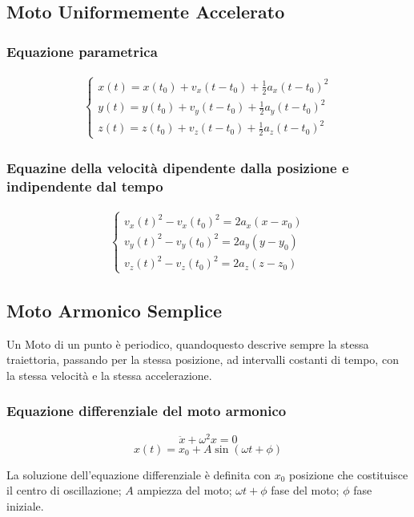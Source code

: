 \documentclass[12pt,a4paper]{report}
\begin{document}
	\subsection{Moto Uniformemente Accelerato}
		\subsubsection{Equazione parametrica}
	
		\begin{align*} 
		\begin{cases} x(t)= x(t_{0})+v_{x}(t-t_{0})+\frac{1}{2}a_{x}(t-t_{0})^{2}\\y(t)= y(t_{0})+v_{y}(t-t_{0})+\frac{1}{2}a_{y}(t-t_{0})^{2}\\z(t)= z(t_{0})+v_{z}(t-t_{0})+\frac{1}{2}a_{z}(t-t_{0})^{2} \end{cases}
		\end{align*}
	
		\subsubsection{Equazine della velocità dipendente dalla posizione e indipendente dal tempo}
		\begin{align*}
		\begin{cases} v_{x}(t)^{2}-v_{x}(t_{0})^{2}=2a_{x}(x-x_{0}) \\ v_{y}(t)^{2}-v_{y}(t_{0})^{2}=2a_{y}(y-y_{0}) \\ v_{z}(t)^{2}-v_{z}(t_{0})^{2}=2a_{z}(z-z_{0})\end{cases}
		\end{align*}

	\subsection{Moto Armonico Semplice}
Un Moto di un punto è periodico, quandoquesto descrive sempre la stessa traiettoria, passando per la stessa posizione, ad intervalli costanti di tempo, con la stessa velocità e la stessa accelerazione.
		\subsubsection{Equazione differenziale del moto armonico}
		
		\[\ddot{x} + \omega^{2}x=0\]
		\[x(t) = x_{0} + A\sin(\omega t +\phi) \]
		
La soluzione dell'equazione differenziale è definita con $x_{0}$ posizione che costituisce il centro di oscillazione; $A$ ampiezza del moto; $\omega t +\phi$ fase del moto; $\phi$ fase iniziale.
\end{document}
